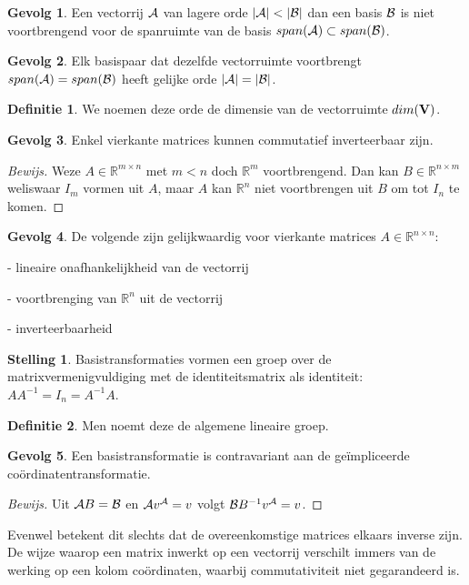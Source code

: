 \documentclass{amsart}
\theoremstyle{definition}
\newtheorem{thm}{Stelling}[section]
\newtheorem{dfn}{Definitie}[section]
\newtheorem{csq}{Gevolg}[section]
\newenvironment{bewijs}{\begin{proof}[Bewijs]}{\end{proof}}
\newcommand{\realnums}{\mathbb{R}}
\newcommand{\realn}[1][n]{\realnums^{#1}}
\newcommand{\realmx}[2][n]{\realn[#2 \times #1]}
\newcommand{\realnxn}{\realmx{n}}
\newcommand{\realmxn}{\realmx{m}}
\newcommand{\vecspace}[1][v]{\mathrm{\mathbf{\MakeUppercase#1}}}
\newcommand{\abs}[1]{\lvert{#1}\rvert}
\newcommand{\vecrow}[1][a]{\mathcal{\MakeUppercase{#1}}}
\begin{document}
\begin{csq}
	Een vectorrij $\vecrow$ van lagere orde $\abs\vecrow < \abs{\vecrow[b]}$ dan een basis $\vecrow[b]$ is niet voortbrengend voor de spanruimte van de basis $span(\vecrow) \subset span(\vecrow[b])$.
\end{csq}

\begin{csq}
	Elk basispaar dat dezelfde vectorruimte voortbrengt $span(\vecrow) = span(\vecrow[b])$ heeft gelijke orde $\abs\vecrow = \abs{\vecrow[b]}$.
\end{csq}

\begin{dfn}
	We noemen deze orde de dimensie van de vectorruimte $dim(\vecspace)$.
\end{dfn}

\begin{csq}
	Enkel vierkante matrices kunnen commutatief inverteerbaar zijn.
	\begin{bewijs}
		Weze $A \in \realmxn$ met $m < n$ doch $\realn[m]$ voortbrengend.
		Dan kan $B \in \realmx[m]{n}$ weliswaar $I_m$ vormen uit $A$, maar $A$ kan $\realn$ niet voortbrengen uit $B$ om tot $I_n$ te komen.
	\end{bewijs}
\end{csq}

\begin{csq}
	De volgende zijn gelijkwaardig voor vierkante matrices $A \in \realnxn$:

	- lineaire onafhankelijkheid van de vectorrij

	- voortbrenging van $\realn$ uit de vectorrij

	- inverteerbaarheid
\end{csq}

\begin{thm}
	Basistransformaties vormen een groep over de matrixvermenigvuldiging met de identiteitsmatrix als identiteit: $AA^{-1} = I_n = A^{-1}A$.
\end{thm}

\begin{dfn}
	Men noemt deze de algemene lineaire groep.
\end{dfn}

\begin{csq}
	Een basistransformatie is contravariant aan de ge\"{i}mpliceerde co\"{o}rdinatentransformatie.
	\begin{bewijs}
		Uit $\vecrow B = \vecrow[b]$ en $\vecrow v^{\vecrow}= v$ volgt $\vecrow[b] B^{-1} v^{\vecrow}= v$. 
	\end{bewijs}
	Evenwel betekent dit slechts dat de overeenkomstige matrices elkaars inverse zijn.
	De wijze waarop een matrix inwerkt op een vectorrij verschilt immers van de werking op een kolom coördinaten, waarbij commutativiteit niet gegarandeerd is.
\end{csq}
\end{document}
